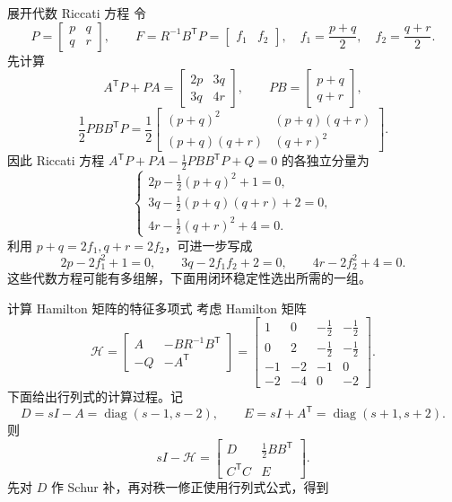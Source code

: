 \documentclass[11pt]{article}
\begin{document}
\begin{solution}
\begin{proofstep}{展开代数 Riccati 方程}
令
\[
 P=\begin{bmatrix}p&q\\q&r\end{bmatrix},\qquad
 F=R^{-1}B^{\mathsf T}P=\begin{bmatrix}f_1&f_2\end{bmatrix},
 \quad f_1=\frac{p+q}{2},\quad f_2=\frac{q+r}{2}.
\]
先计算
\[
 A^{\mathsf T}P+PA=\begin{bmatrix}2p&3q\\3q&4r\end{bmatrix},\qquad
 PB=\begin{bmatrix}p+q\\q+r\end{bmatrix},
\]
\[
 \frac12PBB^{\mathsf T}P
 =\frac12\begin{bmatrix}(p+q)^2&(p+q)(q+r)\\(p+q)(q+r)&(q+r)^2\end{bmatrix}.
\]
因此 Riccati 方程
$A^{\mathsf T}P+PA-\tfrac12PBB^{\mathsf T}P+Q=0$ 的各独立分量为
\[
 \begin{cases}
 2p-\tfrac12(p+q)^2+1=0,\\
 3q-\tfrac12(p+q)(q+r)+2=0,\\
 4r-\tfrac12(q+r)^2+4=0.
 \end{cases}
\]
利用 $p+q=2f_1,q+r=2f_2$，可进一步写成
\[
 2p-2f_1^2+1=0,\qquad
 3q-2f_1f_2+2=0,\qquad
 4r-2f_2^2+4=0.
\]
这些代数方程可能有多组解，下面用闭环稳定性选出所需的一组。
\end{proofstep}
\begin{proofstep}{计算 Hamilton 矩阵的特征多项式}
考虑 Hamilton 矩阵
\[
 \mathcal H=\begin{bmatrix}A&-BR^{-1}B^{\mathsf T}\\-Q&-A^{\mathsf T}\end{bmatrix}
 =\begin{bmatrix}
 1&0&-\frac12&-\frac12\\
 0&2&-\frac12&-\frac12\\
 -1&-2&-1&0\\
 -2&-4&0&-2
 \end{bmatrix}.
\]
下面给出行列式的计算过程。记
\[
 D=sI-A=\operatorname{diag}(s-1,s-2),\qquad
 E=sI+A^{\mathsf T}=\operatorname{diag}(s+1,s+2).
\]
则
\[
 sI-\mathcal H=\begin{bmatrix}D&\tfrac12BB^{\mathsf T}\\C^{\mathsf T}C&E\end{bmatrix}.
\]
先对 $D$ 作 Schur 补，再对秩一修正使用行列式公式，得到

\end{proofstep}
\end{solution}
\end{document}
